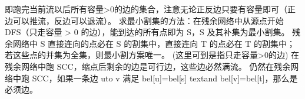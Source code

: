 {}\markdownRendererInterblockSeparator
{}
\markdownRendererSectionEnd \markdownRendererSectionBegin
{}\markdownRendererInterblockSeparator
{}\markdownRendererSectionBegin
\markdownRendererSectionBegin
{}\markdownRendererInterblockSeparator
{}即跑完当前流以后所有容量>0的边的集合，注意无论正反边只要有容量即可（正边可以推流，反边可以退流）。\markdownRendererInterblockSeparator
{}
\markdownRendererSectionEnd \markdownRendererSectionBegin
{}\markdownRendererInterblockSeparator
{}求最小割集的方法：在残余网络中从源点开始 \markdownRendererDollarSign{}DFS\markdownRendererDollarSign{}（只走容量 > 0 的边），能到达的所有点即为 \markdownRendererDollarSign{}S\markdownRendererDollarSign{}，\markdownRendererDollarSign{}S\markdownRendererDollarSign{} 及其补集为最小割集。\markdownRendererInterblockSeparator
{}
\markdownRendererSectionEnd \markdownRendererSectionBegin
{}\markdownRendererInterblockSeparator
{}残余网络中 \markdownRendererDollarSign{}S\markdownRendererDollarSign{} 直接连向的点必在 \markdownRendererDollarSign{}S\markdownRendererDollarSign{} 的割集中，直接连向 \markdownRendererDollarSign{}T\markdownRendererDollarSign{} 的点必在 \markdownRendererDollarSign{}T\markdownRendererDollarSign{} 的割集中；若这些点的并集为全集，则最小割方案唯一。\markdownRendererParagraphSeparator
{}(这里可到是指只走容量>0的边)\markdownRendererInterblockSeparator
{}
\markdownRendererSectionEnd \markdownRendererSectionBegin
{}\markdownRendererInterblockSeparator
{}在残余网络中跑 \markdownRendererDollarSign{}SCC\markdownRendererDollarSign{}，缩点后剩余的边是可行边，这些边必然满流。\markdownRendererInterblockSeparator
{}
\markdownRendererSectionEnd \markdownRendererSectionBegin
{}\markdownRendererInterblockSeparator
{}仍然在残余网络中跑 \markdownRendererDollarSign{}SCC\markdownRendererDollarSign{}，如果一条边 \markdownRendererDollarSign{}u\markdownRendererBackslash{}to v\markdownRendererDollarSign{} 满足 \markdownRendererDollarSign{}bel[u]=bel[s]\markdownRendererBackslash{} \markdownRendererBackslash{}text\markdownRendererLeftBrace{}and\markdownRendererRightBrace{}\markdownRendererBackslash{} bel[v]=bel[t]\markdownRendererDollarSign{}，那么是必须边。\markdownRendererInterblockSeparator
{}
\markdownRendererSectionEnd \markdownRendererSectionBegin
{}\markdownRendererInterblockSeparator
